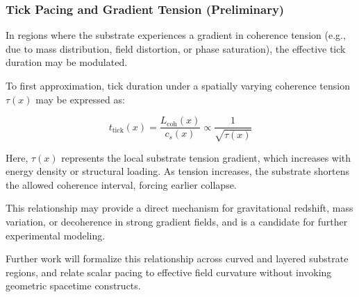 \documentclass[preprints,article,submit,pdftex,moreauthors]{Definitions/mdpi}
\begin{document}
\subsubsection{Tick Pacing and Gradient Tension (Preliminary)}

In regions where the substrate experiences a gradient in coherence tension (e.g., due to mass distribution, field distortion, or phase saturation), the effective tick duration may be modulated.

To first approximation, tick duration under a spatially varying coherence tension \( \tau(x) \) may be expressed as:

\[
t_{\text{tick}}(x) = \frac{L_{\text{coh}}(x)}{c_s(x)} \propto \frac{1}{\sqrt{\tau(x)}}
\]

Here, \( \tau(x) \) represents the local substrate tension gradient, which increases with energy density or structural loading. As tension increases, the substrate shortens the allowed coherence interval, forcing earlier collapse.

This relationship may provide a direct mechanism for gravitational redshift, mass variation, or decoherence in strong gradient fields, and is a candidate for further experimental modeling.

\smallskip

Further work will formalize this relationship across curved and layered substrate regions, and relate scalar pacing to effective field curvature without invoking geometric spacetime constructs.



\isPreprints{}{%
\begin{adjustwidth}{-\extralength}{0cm}
} %
\end{document}
